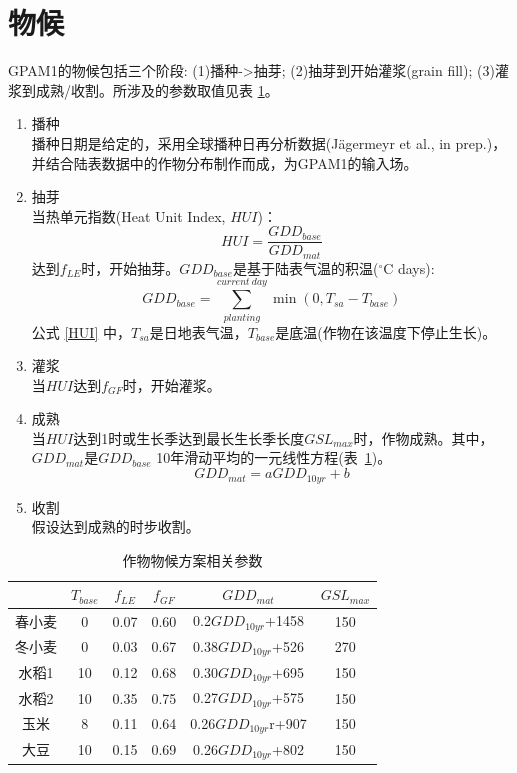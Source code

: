 \section{物候}
GPAM1的物候包括三个阶段: (1)播种->抽芽; (2)抽芽到开始灌浆(grain fill); (3)灌浆到成熟/收割。所涉及的参数取值见表 \ref{tab:作物物候方案相关参数}。\\
\begin{enumerate}
  \item 播种\\
  播种日期是给定的，采用全球播种日再分析数据(Jägermeyr et al., in prep.)，并结合陆表数据中的作物分布制作而成，为GPAM1的输入场。
  \item 抽芽\\
  当热单元指数(Heat Unit Index, $HUI$)：
  \begin{equation}\label{HUI}
  HUI=\frac{GDD_{base}}{GDD_{mat}}
  \end{equation}
  达到$f_{LE}$时，开始抽芽。$GDD_{base}$是基于陆表气温的积温($^{\circ}$C days):
  \begin{equation}
  GDD_{ {base }}=\sum_{planting}^{current\ day} \min \left(0, T_{sa}-T_{base}\right)
  \end{equation}
  公式 \eqref{HUI} 中，$T_{sa}$是日地表气温，$T_{base}$是底温(作物在该温度下停止生长)。\\
  \item 灌浆\\
  当$HUI$达到$f_{GF}$时，开始灌浆。
  \item 成熟\\
  当$HUI$达到1时或生长季达到最长生长季长度$GSL_{max}$时，作物成熟。其中，$GDD_{mat}$是$GDD_{base}$ 
  10年滑动平均的一元线性方程(表~\ref{tab:作物物候方案相关参数})。
  \begin{equation}
    GDD_{mat}=a GDD_{10yr}+b
  \end{equation}
  \item 收割\\
  假设达到成熟的时步收割。
\end{enumerate}
\begin{table}[]
  \centering
  \caption{作物物候方案相关参数}
  \label{tab:作物物候方案相关参数}
\begin{tabular}{@{}cccccc@{}}
\toprule
    & $T_{base}$ & $f_{LE}$  & $f_{GF}$  & $GDD_{mat}$          & $GSL_{max}$ \\ \midrule
春小麦 & 0     & 0.07 & 0.60 & 0.2$GDD_{10yr}$+1458 & 150    \\
冬小麦 & 0     & 0.03 & 0.67 & 0.38$GDD_{10yr}$+526 & 270    \\
水稻1 & 10    & 0.12 & 0.68 & 0.30$GDD_{10yr}$+695 & 150    \\
水稻2 & 10    & 0.35 & 0.75 & 0.27$GDD_{10yr}$+575 & 150    \\
玉米  & 8     & 0.11 & 0.64 & 0.26$GDD_{10yr}$r+907 & 150    \\
大豆  & 10    & 0.15 & 0.69 & 0.26$GDD_{10yr}$+802 & 150    \\ \bottomrule
\end{tabular}
\end{table}

